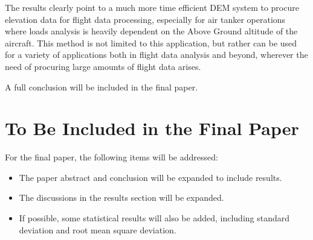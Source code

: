 \documentclass[conf]{new-aiaa}
\begin{document}
The results clearly point to a much more time efficient DEM system to procure elevation data for flight data processing, especially for air tanker operations where loads analysis is heavily dependent on the Above Ground altitude of the aircraft. This method is not limited to this application, but rather can be used for a variety of applications both in flight data analysis and beyond, wherever the need of procuring large amounts of flight data arises.

A full conclusion will be included in the final paper.

\FloatBarrier

\section{To Be Included in the Final Paper}

For the final paper, the following items will be addressed:

\begin{itemize} \item The paper abstract and conclusion will be expanded to include results.
\item The discussions in the results section will be expanded.
\item If possible, some statistical results will also be added, including standard deviation and root mean square deviation. \end{itemize}

\FloatBarrier


\end{document}
